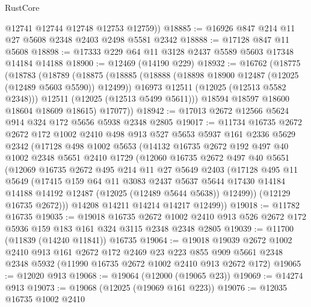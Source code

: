 \begin{lexlean}{RustCore}
\begin{coremodule}
        @12741
        @12744
        @12748
        @12753
        @12759))
@18885 := @16926 @847 @214 @11 @27 @5608 @2348 @2403 @2498 @5581 @2342
@18888 := @17128 @847 @11 @5608
@18898 := @17333 @229 @64 @11 @3128 @2437 @5589 @5603 @17348 @14184 @14188
@18900 := @12469 (@14190 @229)
@18932 := @16762
    (@18775
      (@18783
        (@18789
          (@18875
            (@18885
              (@18888 (@18898 @18900 @12487 (@12025 (@12489 @5603 @5590)) @12499))
              @16973
              @12511
              (@12025 (@12513 @5582 @2348)))
            @12511
            (@12025 (@12513 @5499 @5611)))
          @18594
          @18597
          @18600
          @18604
          @18609
          @18615)
        @17077))
@18942 := @17013 @2672 @12566 @5624 @914 @324 @172 @5656 @5938 @2348 @2805
@19017 := @11734
    @16735
    @2672
    @2672
    @172
    @1002
    @2410
    @498
    @913
    @527
    @5653
    @5937
    @161
    @2336
    @5629
    @2342
    (@17128
      @498
      @1002
      @5653
      (@14132
        @16735
        @2672
        @192
        @497
        @40
        @1002
        @2348
        @5651
        @2410
        @1729
        (@12060
          @16735
          @2672
          @497
          @40
          @5651
          (@12069
            @16735
            @2672
            @495
            @214
            @11
            @27
            @5649
            @2403
            (@17128
              @495
              @11
              @5649
              (@17415
                @159
                @64
                @11
                @3083
                @2437
                @5637
                @5644
                @17430
                @14184
                @14188
                @14192
                @12487
                (@12025 (@12489 @5644 @5638))
                @12499))
            (@12129 @16735 @2672)))
        @14208
        @14211
        @14214
        @14217
        @12499))
@19018 := @11782 @16735
@19035 := @19018
    @16735
    @2672
    @1002
    @2410
    @913
    @526
    @2672
    @172
    @5936
    @159
    @183
    @161
    @324
    @3115
    @2348
    @2348
    @2805
@19039 := @11700 (@11839 (@14240 @11841)) @16735
@19064 := @19018
    @19039
    @2672
    @1002
    @2410
    @913
    @161
    @2672
    @172
    @2469
    @23
    @223
    @855
    @909
    @5661
    @2348
    @2348
    @5932
    (@11990 @16735 @2672 @1002 @2410 @913 @2672 @172)
@19065 := @12020 @913
@19068 := @19064 (@12000 (@19065 @23))
@19069 := @14274 @913
@19073 := @19068 (@12025 (@19069 @161 @223))
@19076 := @12035 @16735 @1002 @2410

\end{coremodule}
\end{lexlean}
